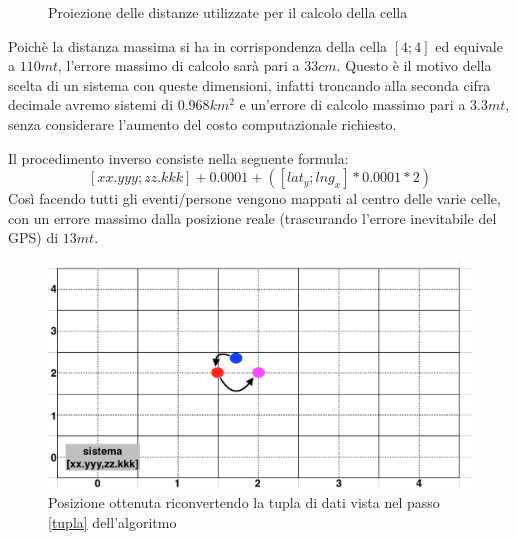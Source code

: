 \begin{enumerate}
\begin{figure}[H]
	\caption{Proiezione delle distanze utilizzate per il calcolo della cella}
	\label{fig:dist}
\end{figure}
Poichè la distanza massima si ha in corrispondenza della cella $[4;4]$ ed equivale a $110 mt$, l'errore massimo di calcolo sarà pari a $33cm$. Questo è il motivo della scelta di un sistema con queste dimensioni, infatti troncando alla seconda cifra decimale avremo sistemi di $0.968km^{2}$ e un'errore di calcolo massimo pari a $3.3mt$, senza considerare l'aumento del costo computazionale richiesto. 
\end{enumerate}
\newpage

Il procedimento inverso consiste nella seguente formula:
\begin{equation}
\label{equazione}
 [xx.yyy;zz.kkk]+0.0001+([lat_y;lng_x]*0.0001*2)
\end{equation}
Così facendo tutti gli eventi/persone vengono mappati al centro delle varie celle, con un errore massimo dalla posizione reale (trascurando l'errore inevitabile del GPS) di $13mt$.
\begin{figure}[H]
	\centering
	\includegraphics[scale=0.6]{Implementazione/final.png}
	\caption{Posizione ottenuta riconvertendo la tupla di dati vista nel passo \ref{tupla} dell'algoritmo }
	\label{fig:final}
\end{figure}
\newpage

